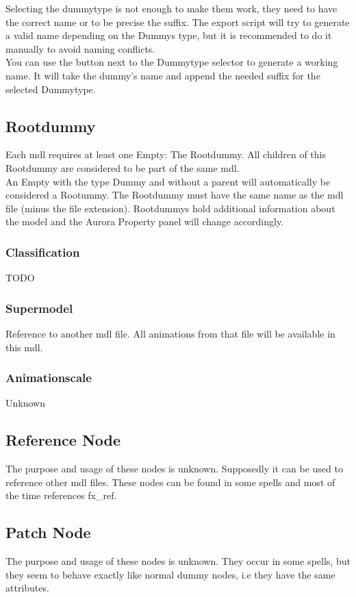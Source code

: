 Selecting the dummytype is not enough to make them work, they need to have
the correct name or to be precise the suffix.
The export script will try to generate a valid name depending on
the Dummys type, but it is recommended to do it manually to avoid naming
conflicts. \\

You can use the button next to the Dummytype selector to generate a
working name. It will take the dummy's name and append the needed suffix for
the selected Dummytype. \\

\subsection{Rootdummy}
Each mdl requires at least one Empty: The Rootdummy. All children
of this Rootdummy are considered to be part of the same mdl. \\

An Empty with the type Dummy and without a parent will automatically be
considered a Rootummy. The Rootdummy must have the same name as the
mdl file (minus the file extension). Rootdummys hold additional
information about the model and the Aurora Property panel will
change accordingly.

\subsubsection*{Classification}
TODO

\subsubsection*{Supermodel}
Reference to another mdl file. All animations from that file 
will be available in this mdl.

\subsubsection*{Animationscale}
Unknown

\subsection{Reference Node}
The purpose and usage of these nodes is unknown. Supposedly it can be used to
reference other mdl files. These nodes can be found in some spells and
most of the time references fx\_ref.

\subsection{Patch Node}
The purpose and usage of these nodes is unknown. They occur in some spells, but
they seem to behave exactly like normal dummy nodes, i.e they have the same
attributes.

